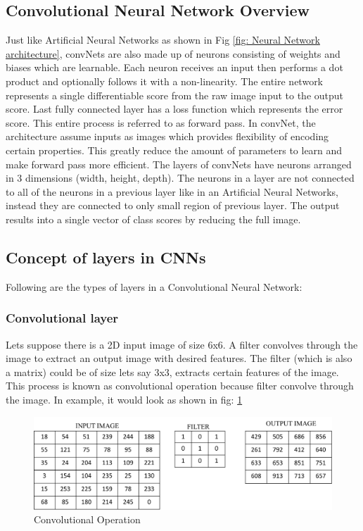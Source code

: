 \documentclass[11pt]{article}
\begin{document}
\subsection{Convolutional Neural Network Overview}
Just like Artificial Neural Networks as shown in Fig \ref{fig: Neural Network architecture}, convNets are also made up of neurons consisting of weights and biases which are learnable. Each neuron receives an input then performs a dot product and optionally follows it with a non-linearity. The entire network represents a single differentiable score from the raw image input to the output score. Last fully connected layer has a loss function which represents the error score. This entire process is referred to as forward pass. In convNet, the architecture assume inputs as images which provides flexibility of encoding certain properties. This greatly reduce the amount of parameters to learn and make forward pass more efficient. The layers of convNets have neurons arranged in 3 dimensions (width, height, depth). The neurons in a layer are not connected to all of the neurons in a previous layer like in an Artificial Neural Networks, instead they are connected to only small region of previous layer. The output results into a single vector of class scores by reducing the full image.

\subsection{Concept of layers in CNNs}
Following are the types of layers in a Convolutional Neural Network:

\subsubsection{Convolutional layer}
Lets suppose there is a 2D input image of size 6x6. A filter convolves through the image to extract an output image with desired features. The filter (which is also a matrix) could be of size lets say 3x3, extracts certain features of the image. This process is known as convolutional operation because filter convolve through the image. In example, it would look as shown in fig: \ref{fig:Convolutional Operation}

\begin{figure}[H]
	\includegraphics[width=\linewidth]{files/cnn_architecture/conv.png}
	\caption{Convolutional Operation}
	\label{fig:Convolutional Operation}
\end{figure}
\end{document}
